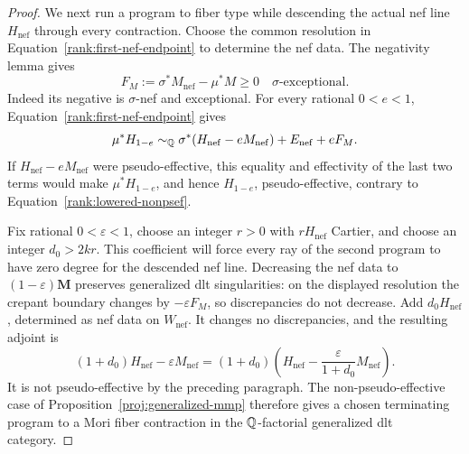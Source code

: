 \begin{proof}
We next run a program to fiber type while descending the actual nef line
\(H_{\mathrm{nef}}\) through every contraction.  Choose the common
resolution in Equation~\eqref{rank:first-nef-endpoint} to determine the nef
data.  The negativity lemma gives
\[
                F_M:=\sigma^*M_{\mathrm{nef}}-\mu^*M\geq0
                \quad\text{\(\sigma\)-exceptional}.
\]
Indeed its negative is \(\sigma\)-nef and exceptional.  For every
rational \(0<e<1\), Equation~\eqref{rank:first-nef-endpoint} gives
\begin{equation}
 \mu^*H_{1-e}\sim_{\mathbb Q}
       \sigma^*(H_{\mathrm{nef}}-eM_{\mathrm{nef}})
       +E_{\mathrm{nef}}+eF_M .
\label{rank:lowered-comparison}
\end{equation}
If \(H_{\mathrm{nef}}-eM_{\mathrm{nef}}\) were pseudo-effective, this
equality and effectivity of the last two terms would make
\(\mu^*H_{1-e}\), and hence \(H_{1-e}\), pseudo-effective, contrary to
Equation~\eqref{rank:lowered-nonpsef}.

Fix rational \(0<\varepsilon<1\), choose an integer \(r>0\) with
\(rH_{\mathrm{nef}}\) Cartier, and choose an integer \(d_0>2kr\).
This coefficient will force every ray of the second program to have zero
degree for the descended nef line.  Decreasing the nef data to
\((1-\varepsilon)\boldsymbol M\) preserves generalized dlt
singularities: on the displayed resolution the crepant boundary
changes by \(-\varepsilon F_M\), so discrepancies do not decrease.
Add \(d_0H_{\mathrm{nef}}\), determined as nef data on
\(W_{\mathrm{nef}}\).  It changes no discrepancies, and the resulting
adjoint is
\[
 (1+d_0)H_{\mathrm{nef}}-\varepsilon M_{\mathrm{nef}}
 =(1+d_0)\left(
       H_{\mathrm{nef}}-\frac{\varepsilon}{1+d_0}M_{\mathrm{nef}}\right).
\]
It is not pseudo-effective by the preceding paragraph.  The
non-pseudo-effective case of Proposition~\ref{proj:generalized-mmp}
therefore gives a chosen terminating program to a Mori fiber
contraction in the \(\mathbb Q\)-factorial generalized dlt category.


\end{proof}
